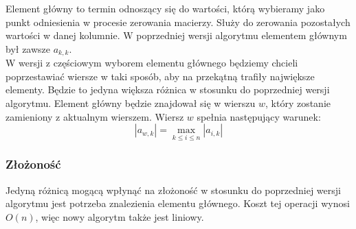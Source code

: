 \documentclass{article}
\begin{document}
Element główny to termin odnoszący się do wartości, którą wybieramy jako punkt odniesienia w procesie zerowania macierzy.
Służy do zerowania pozostałych wartości w danej kolumnie.
W poprzedniej wersji algorytmu elementem głównym był zawsze $a_{k, k}$.\\

W wersji z częściowym wyborem elementu głównego będziemy chcieli poprzestawiać wiersze w taki sposób, aby na przekątną trafiły największe elementy.
Będzie to jedyna większa różnica w stosunku do poprzedniej wersji algorytmu.
Element główny będzie znajdował się w wierszu $w$, który zostanie zamieniony z aktualnym wierszem.
Wiersz $w$ spełnia następujący warunek:
$$
|a_{w, k}| = \max_{k \le i \le n}{|a_{i, k}|}
$$

\subsubsection{Złożoność}
Jedyną różnicą mogącą wpłynąć na złożoność w stosunku do poprzedniej wersji algorytmu jest potrzeba znalezienia elementu głównego.
Koszt tej operacji wynosi $O(n)$, więc nowy algorytm także jest liniowy.
\end{document}
